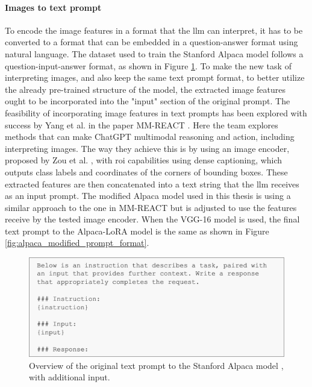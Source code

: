         \paragraph{Images to text prompt\\}
        To encode the image features in a format that the \gls{llm} can interpret, it has to be converted to a format that can be embedded in a question-answer format using natural language. The dataset used to train the Stanford Alpaca model follows a question-input-answer format, as shown in Figure \ref{fig:alpaca_prompt_format}. To make the new task of interpreting images, and also keep the same text prompt format, to better utilize the already pre-trained structure of the model, the extracted image features 
        ought to be incorporated into the "input" section of the original prompt. The feasibility of incorporating image features in text prompts has been explored with success by Yang et al. in the paper MM-REACT \cite{yangMMREACTPromptingChatGPT2023}. Here the team explores methods that can make ChatGPT multimodal reasoning and action, including interpreting images. 
        The way they achieve this is by using an image encoder, proposed by Zou et al. \cite{zouGeneralizedDecodingPixel2022}, with \gls{roi} capabilities using dense captioning, which outputs class labels and coordinates of the corners of  bounding boxes. These extracted features are then concatenated into a text string that the \gls{llm} receives as an input prompt. The modified Alpaca model used in this thesis is using a similar approach to the one in MM-REACT but is adjusted to use the features receive by the tested image encoder. When the VGG-16 model is used, the final text prompt to the Alpaca-LoRA model is the same as shown in Figure \ref{fig:alpaca_modified_prompt_format}.
        
        \begin{figure}[htb]
            \centerline{
            \includegraphics[width=\textwidth]{images/alpaca_prompt_format.png}}
            \caption[Overview of the original text prompt to the Stanford Alpaca model, with additional input.]{Overview of the original text prompt to the Stanford Alpaca model \cite{taoriStanfordCRFM, taoriStanfordAlpacaInstructionfollowing2023}, with additional input.}
            \label{fig:alpaca_prompt_format}
        \end{figure}

